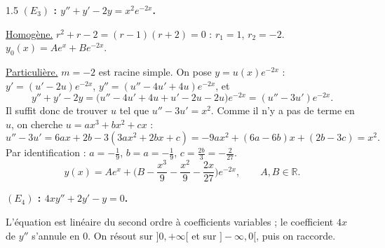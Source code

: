 \documentclass[12pt]{article}
\begin{document}
\begin{spacing}{1.5}
\textbf{$(E_3)$ : $y''+y'-2y=x^2e^{-2x}$.}

\underline{Homogène.} $r^2+r-2=(r-1)(r+2)=0$ : $r_1=1$, $r_2=-2$. $y_0(x)=Ae^x+Be^{-2x}$.

\underline{Particulière.} $m=-2$ est racine simple. On pose $y=u(x)e^{-2x}$ : $y'=(u'-2u)e^{-2x}$, $y''=(u''-4u'+4u)e^{-2x}$, et
\[
y''+y'-2y=\big(u''-4u'+4u+u'-2u-2u\big)e^{-2x}=(u''-3u')e^{-2x}.
\]
Il suffit donc de trouver $u$ tel que $u''-3u'=x^2$. Comme il n'y a pas de terme en $u$, on cherche $u=ax^3+bx^2+cx$ :
\[
u''-3u'=6ax+2b-3(3ax^2+2bx+c)=-9ax^2+(6a-6b)x+(2b-3c)=x^2 .
\]
Par identification : $a=-\frac19$, $b=a=-\frac19$, $c=\frac{2b}{3}=-\frac2{27}$.
\[
\boxed{y(x)=Ae^x+\Big(B-\frac{x^3}{9}-\frac{x^2}{9}-\frac{2x}{27}\Big)e^{-2x},\qquad A,B\in\mathbb{R}}.
\]

\textbf{$(E_4)$ : $4xy''+2y'-y=0$.}

L'équation est linéaire du second ordre à coefficients variables ; le coefficient $4x$ de $y''$ s'annule en $0$. On résout sur $]0,+\infty[$ et sur $]-\infty,0[$, puis on raccorde.


\end{spacing}
\end{document}
